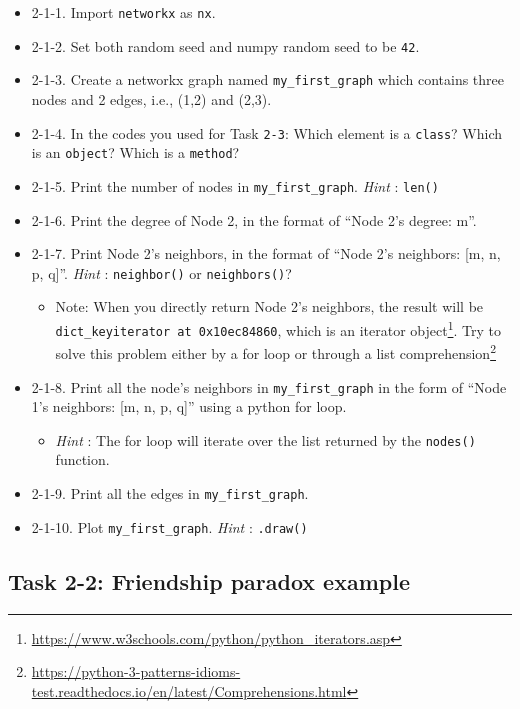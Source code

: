 \documentclass[
]{krantz}
\providecommand{\tightlist}{%
  \setlength{\itemsep}{0pt}\setlength{\parskip}{0pt}}
\renewcommand{\href}[2]{#2\footnote{\url{#1}}}
\begin{document}
\begin{itemize}
\item
  2-1-1. Import \texttt{networkx} as \texttt{nx}.
\item
  2-1-2. Set both random seed and numpy random seed to be \texttt{42}.
\item
  2-1-3. Create a networkx graph named \texttt{my\_first\_graph} which contains three nodes and 2 edges, i.e., (1,2) and (2,3).
\item
  2-1-4. In the codes you used for Task \texttt{2-3}: Which element is a \texttt{class}? Which is an \texttt{object}? Which is a \texttt{method}?
\item
  2-1-5. Print the number of nodes in \texttt{my\_first\_graph}. \emph{Hint} : \texttt{len()}
\item
  2-1-6. Print the degree of Node 2, in the format of ``Node 2's degree: m''.
\item
  2-1-7. Print Node 2's neighbors, in the format of ``Node 2's neighbors: {[}m, n, p, q{]}''. \emph{Hint} : \texttt{neighbor()} or \texttt{neighbors()}?

  \begin{itemize}
  \tightlist
  \item
    Note: When you directly return Node 2's neighbors, the result will be \texttt{dict\_keyiterator\ at\ 0x10ec84860}, which is an \href{https://www.w3schools.com/python/python_iterators.asp}{iterator object}. Try to solve this problem either by a for loop or through a \href{https://python-3-patterns-idioms-test.readthedocs.io/en/latest/Comprehensions.html}{list comprehension}
  \end{itemize}
\item
  2-1-8. Print all the node's neighbors in \texttt{my\_first\_graph} in the form of ``Node 1's neighbors: {[}m, n, p, q{]}'' using a python for loop.

  \begin{itemize}
  \tightlist
  \item
    \emph{Hint} : The for loop will iterate over the list returned by the \texttt{nodes()} function.
  \end{itemize}
\item
  2-1-9. Print all the edges in \texttt{my\_first\_graph}.
\item
  2-1-10. Plot \texttt{my\_first\_graph}. \emph{Hint} : \texttt{.draw()}
\end{itemize}

\hypertarget{task-2-2-friendship-paradox-example}{%
\subsection{Task 2-2: Friendship paradox example}\label{task-2-2-friendship-paradox-example}}
\end{document}
